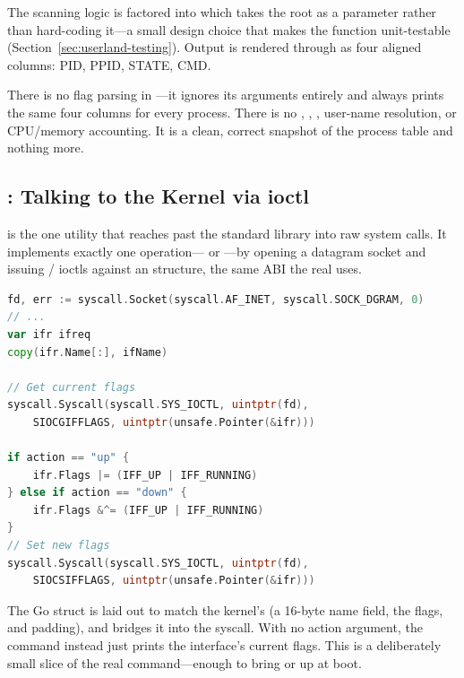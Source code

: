 The scanning logic is factored into  which takes the
 root as a parameter rather than hard-coding it---a small design
choice that makes the function unit-testable (Section~\ref{sec:userland-testing}).
Output is rendered through  as four aligned columns: PID,
PPID, STATE, CMD.

\begin{notebox}
There is no flag parsing in ---it ignores its arguments entirely and
always prints the same four columns for every process. There is no ,
, , user-name resolution, or CPU/memory accounting. It is a
clean, correct snapshot of the process table and nothing more.
\end{notebox}

\subsection{: Talking to the Kernel via ioctl}

 is the one utility that reaches past the standard library into raw
system calls. It implements exactly one operation---
or ---by opening a datagram socket and issuing  /
 ioctls against an  structure, the same ABI the
real  uses.

\begin{lstlisting}[language=Go, caption={Bringing an interface up with a raw ioctl (utils/cmd/ip/main.go)}]
fd, err := syscall.Socket(syscall.AF_INET, syscall.SOCK_DGRAM, 0)
// ...
var ifr ifreq
copy(ifr.Name[:], ifName)

// Get current flags
syscall.Syscall(syscall.SYS_IOCTL, uintptr(fd),
    SIOCGIFFLAGS, uintptr(unsafe.Pointer(&ifr)))

if action == "up" {
    ifr.Flags |= (IFF_UP | IFF_RUNNING)
} else if action == "down" {
    ifr.Flags &^= (IFF_UP | IFF_RUNNING)
}
// Set new flags
syscall.Syscall(syscall.SYS_IOCTL, uintptr(fd),
    SIOCSIFFLAGS, uintptr(unsafe.Pointer(&ifr)))
\end{lstlisting}

The  Go struct is laid out to match the kernel's 
(a 16-byte name field, the flags, and padding), and  bridges
it into the syscall. With no action argument, the command instead just prints the
interface's current flags. This is a deliberately small slice of the real
 command---enough to bring  or  up at boot.

